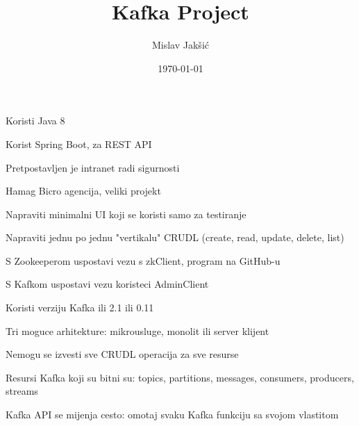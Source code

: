 \documentclass{article}
\title{Kafka Project}
\author{Mislav Jakšić}
\date{\today{}}
\begin{document}
\maketitle

Koristi Java 8

Korist Spring Boot, za REST API

Pretpostavljen je intranet radi sigurnosti

Hamag Bicro agencija, veliki projekt

Napraviti minimalni UI koji se koristi samo za testiranje

Napraviti jednu po jednu "vertikalu" CRUDL (create, read, update, delete, list)

S Zookeeperom uspostavi vezu s zkClient, program na GitHub-u

S Kafkom uspostavi vezu koristeci AdminClient

Koristi verziju Kafka ili 2.1 ili 0.11

Tri moguce arhitekture: mikrousluge, monolit ili server klijent

Nemogu se izvesti sve CRUDL operacija za sve resurse

Resursi Kafka koji su bitni su: topics, partitions, messages, consumers, producers, streams

Kafka API se mijenja cesto: omotaj svaku Kafka funkciju sa svojom vlastitom
\end{document}
